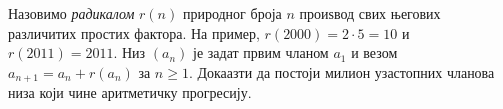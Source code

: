 \problem
Назовимо \emph{радикалом} $r(n)$ природног броја $n$ проиѕвод свих његових
различитих простих фактора.
На пример, $r(2000) = 2 \cdot 5 = 10$ и $r(2011) = 2011$.
Низ $(a_n)$ је задат првим чланом $a_1$ и везом $a_{n + 1} = a_n + r(a_n)$ за
$n \geq 1$.
Докаазти да постоји милион узастопних чланова низа који чине аритметичку
прогресију.

\solution

\endproblem
